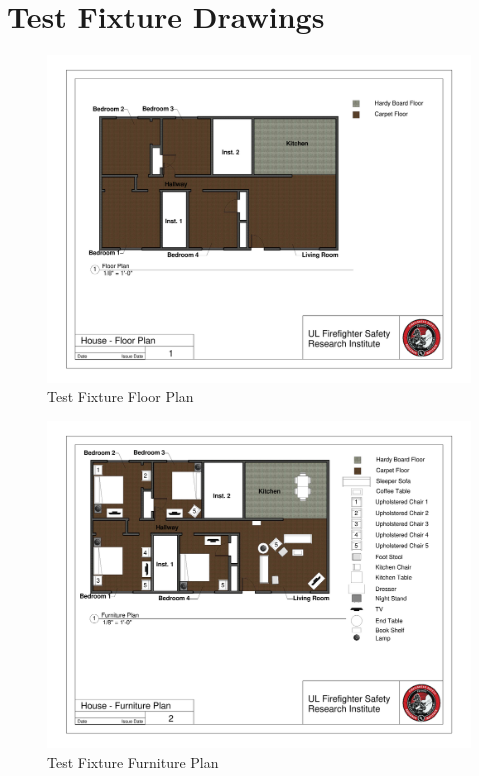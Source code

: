 \clearpage
\chapter{Test Fixture Drawings} \label{App:test_figure_drawings}

\begin{figure}
\includegraphics[width=\textheight]{../0_Images/Appendix_Figures/Floor_Plan}
\caption[]{Test Fixture Floor Plan}
\label{fig:appendix_floorplan}
\end{figure}

\begin{figure}
\includegraphics[width=\textheight]{../0_Images/Appendix_Figures/Furniture_Plan}
\caption[]{Test Fixture Furniture Plan}
\label{fig:appendix_furnitureplan}
\end{figure}

